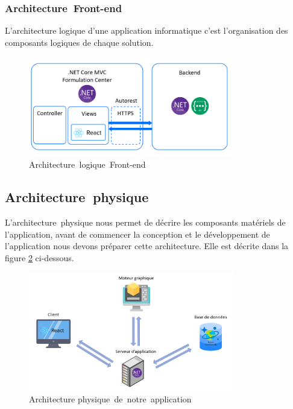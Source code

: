 \subsubsection{Architecture\textcolor{white}{J}Front-end}
L’architecture logique d’une application informatique c’est l’organisation des composants logiques de chaque solution.
\begin{figure}[!ht]
\centering
\includegraphics[width=0.8\textwidth,angle=00]{chapitres/chapitre2/figures/ArchLog-F.png}
\caption{Architecture\textcolor{white}{J}logique\textcolor{white}{J}Front-end}
\label{fig:logiqueFront}
\end{figure}

\subsection{Architecture\textcolor{white}{J}physique}
L’architecture\textcolor{white}{J}physique nous permet de décrire les composants matériels de l’application, avant de commencer la conception et le développement de l’application nous devons préparer cette architecture. Elle est décrite dans la figure \ref{fig:physique} ci-dessous.

\begin{figure}[!ht]
\centering
\includegraphics[width=0.8\textwidth,angle=00]{chapitres/chapitre2/figures/ArchPhy.png}
\caption{Architecture physique\textcolor{white}{J}de\textcolor{white}{J}notre\textcolor{white}{J}application}
\label{fig:physique}
\end{figure}

